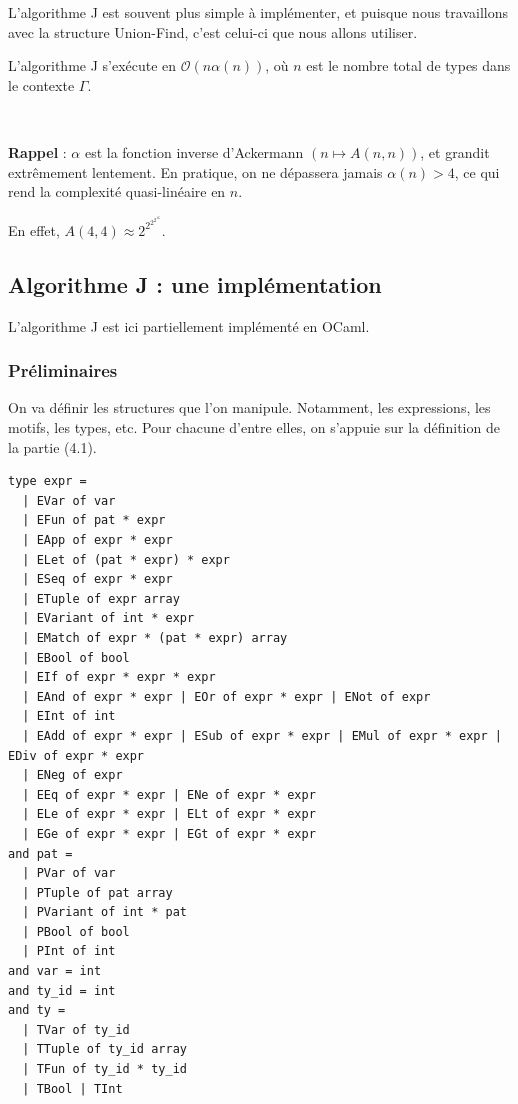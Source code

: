 \documentclass[11pt]{article}
\begin{document}
L'algorithme J est souvent plus simple à implémenter, et puisque nous travaillons avec la structure Union-Find, c'est celui-ci que nous allons utiliser.

\begin{remark}
    L'algorithme J s'exécute en $\mathcal{O}(n\alpha(n))$, où $n$ est le nombre total de types dans le contexte $\Gamma$. 

    ~

    \textbf{Rappel} : $\alpha$ est la fonction inverse d'Ackermann $(n\mapsto A(n, n))$, et grandit extrêmement lentement. En pratique, on ne dépassera jamais $\alpha(n) > 4$, ce qui rend la complexité quasi-linéaire en $n$.
    
    En effet, $A(4, 4)\approx 2^{2^{2^{2^{16}}}}$.
\end{remark}

\subsection{Algorithme J : une implémentation}

L'algorithme J est ici partiellement implémenté en OCaml.

\subsubsection{Préliminaires}

On va définir les structures que l'on manipule. Notamment, les expressions, les motifs, les types, etc. Pour chacune d'entre elles, on s'appuie sur la définition de la partie (4.1).

\begin{lstlisting}
type expr =
  | EVar of var
  | EFun of pat * expr
  | EApp of expr * expr
  | ELet of (pat * expr) * expr
  | ESeq of expr * expr
  | ETuple of expr array
  | EVariant of int * expr
  | EMatch of expr * (pat * expr) array
  | EBool of bool
  | EIf of expr * expr * expr
  | EAnd of expr * expr | EOr of expr * expr | ENot of expr
  | EInt of int
  | EAdd of expr * expr | ESub of expr * expr | EMul of expr * expr | EDiv of expr * expr
  | ENeg of expr
  | EEq of expr * expr | ENe of expr * expr
  | ELe of expr * expr | ELt of expr * expr
  | EGe of expr * expr | EGt of expr * expr
and pat = 
  | PVar of var
  | PTuple of pat array
  | PVariant of int * pat
  | PBool of bool
  | PInt of int
and var = int
and ty_id = int
and ty =
  | TVar of ty_id 
  | TTuple of ty_id array
  | TFun of ty_id * ty_id
  | TBool | TInt
\end{lstlisting}
\end{document}
